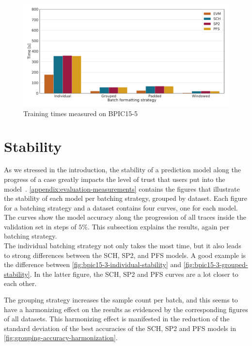 \begin{figure}
    \centering
    \includegraphics[width=\textwidth]{gfx/bpic2015_5/train_timings.pdf}
    \caption{Training times measured on BPIC15-5}
    \label{fig:BPIC15-5-training-timings}
\end{figure}
\FloatBarrier

\section{Stability}\label{sec:eval:stability}
As we stressed in the introduction, the stability of a prediction model along the progress of a case greatly impacts the level of trust that users put into the model~\cite{metzger2015}. \autoref{appendix:evaluation-measurements} contains the figures that illustrate the stability of each model per batching strategy, grouped by dataset. Each figure for a batching strategy and a dataset contains four curves, one for each model. The curves show the model accuracy along the progression of all traces inside the validation set in steps of $5\%$. This subsection explains the results, again per batching strategy.\\

The individual batching strategy not only takes the most time, but it also leads to strong differences between the SCH, SP2, and PFS models. A good example is the difference between \autoref{fig:bpic15-3-individual-stability} and \autoref{fig:bpic15-3-grouped-stability}. In the latter figure, the SCH, SP2 and PFS curves are a lot closer to each other.

The grouping strategy increases the sample count per batch, and this seems to have a harmonizing effect on the results as evidenced by the corresponding figures of all datasets. This harmonizing effect is manifested in the reduction of the standard deviation of the best accuracies of the SCH, SP2 and PFS models in \autoref{fig:grouping-accuracy-harmonization}.

